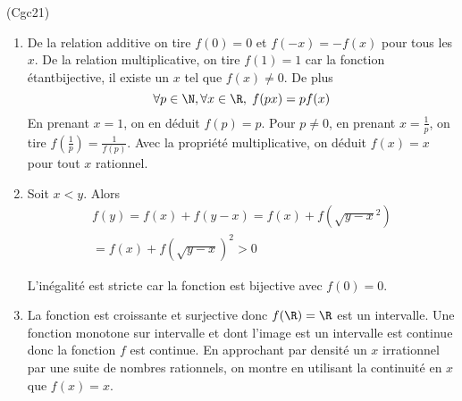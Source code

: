 \begin{tiny}(Cgc21)\end{tiny}
\begin{enumerate}
 \item De la relation additive on tire $f(0)=0$ et $f(-x) = -f(x)$ pour tous les $x$. De la relation multiplicative, on tire $f(1)=1$ car la fonction étantbijective, il existe un $x$ tel que $f(x)\neq 0$. De plus
\[
\forall p \in\N, \forall x\in \R,\; f(px) = p f(x)
\]
En prenant $x=1$, on en déduit $f(p)=p$. Pour $p\neq 0$, en prenant $x=\frac{1}{p}$, on tire $f(\frac{1}{p}) = \frac{1}{f(p)}$.\newline
Avec la propriété multiplicative, on déduit $f(x)=x$ pour tout $x$ rationnel.
 \item Soit $x < y$. Alors
\begin{multline*}
 f(y) = f(x) + f(y-x)
 = f(x) + f(\sqrt{y-x}^2)\\
 = f(x) + f(\sqrt{y-x})^2 > 0
\end{multline*}

L'inégalité est stricte car la fonction est bijective avec $f(0)=0$.
 \item La fonction est croissante et surjective donc $f(\R)=\R$ est un intervalle. Une fonction monotone sur intervalle et dont l'image est un intervalle est continue donc la fonction $f$ est continue. En approchant par densité un $x$ irrationnel par une suite de nombres rationnels, on montre en utilisant la continuité en $x$ que $f(x)=x$.
\end{enumerate}
